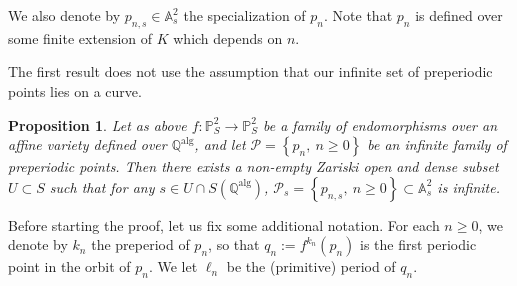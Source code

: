 \documentclass[11 pt, oneside, a4paper]{amsart}
\newcommand{\Q}{\mathbb{Q}}
\newcommand{\A}{\mathbb{A}}
\renewcommand{\P}{\mathbb{P}}
\newcommand{\set}[1]{{\left\{#1\right\}}}
\DeclareMathOperator{\alg}{alg}
\newtheorem{prop}[thm]{Proposition}
\theoremstyle{definition}
\theoremstyle{definition}
\begin{document}
 

We also denote by $p_{n,s}\in \A^2_s$ the specialization of $p_n$. Note that 
 $p_n$ is defined over some finite extension of $K$ which depends on $n$.
 
 
  
The first result does not use the assumption that our infinite set of preperiodic points lies on a curve.

\begin{prop}\label{prop:keeping}
Let as above $ {f}\colon \P^2_S \to \P^2_S$  be a family of endomorphisms   over an affine variety defined over $\Q^{\alg}$, and let 
$\mathcal {P}  = \set{p_n, \ n\geq 0}$ be an infinite family of preperiodic points. Then there exists a 
non-empty Zariski open and dense subset $U\subset S$ such that for any $s\in U\cap S(\Q^{\mathrm{alg}})$, 
$\mathcal P_s = \set{p_{n, s}, \ n\geq 0}\subset \A^2_s$ is infinite.
\end{prop}

Before starting the proof, let us fix some additional notation. For each $n\geq 0$, 
 we denote by $k_n$ the preperiod of $p_n$, so that 
 $q_n  := f^{k_n}(p_n)$ is the first periodic point in the orbit of $p_n$. 
We let $\ell_n$ be the (primitive) period of $q_n$. 
\end{document}
